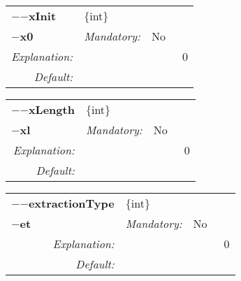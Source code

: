 \begin{center}\begin{tabular}{|rr|rlrl|}
\hline
\multicolumn{2}{|l|}{\textbf{$-$$-$xInit}} & \multicolumn{4}{|l|}{$\{$int$\}$} \\
\cline{3-6}
\multicolumn{2}{|l|}{\textbf{$-$x0}} & \emph{Mandatory:} & No & &  \\
\hline
\emph{Explanation:} & \multicolumn{5}{|p{12cm}|}{0} \\
\hline
\emph{Default:} & \multicolumn{5}{|p{12cm}|}{ } \\
\hline
\end{tabular}\end{center}
\begin{center}\begin{tabular}{|rr|rlrl|}
\hline
\multicolumn{2}{|l|}{\textbf{$-$$-$xLength}} & \multicolumn{4}{|l|}{$\{$int$\}$} \\
\cline{3-6}
\multicolumn{2}{|l|}{\textbf{$-$xl}} & \emph{Mandatory:} & No & &  \\
\hline
\emph{Explanation:} & \multicolumn{5}{|p{12cm}|}{0} \\
\hline
\emph{Default:} & \multicolumn{5}{|p{12cm}|}{ } \\
\hline
\end{tabular}\end{center}
\begin{center}\begin{tabular}{|rr|rlrl|}
\hline
\multicolumn{2}{|l|}{\textbf{$-$$-$extractionType}} & \multicolumn{4}{|l|}{$\{$int$\}$} \\
\cline{3-6}
\multicolumn{2}{|l|}{\textbf{$-$et}} & \emph{Mandatory:} & No & &  \\
\hline
\emph{Explanation:} & \multicolumn{5}{|p{12cm}|}{0} \\
\hline
\emph{Default:} & \multicolumn{5}{|p{12cm}|}{ } \\
\hline
\end{tabular}\end{center}
